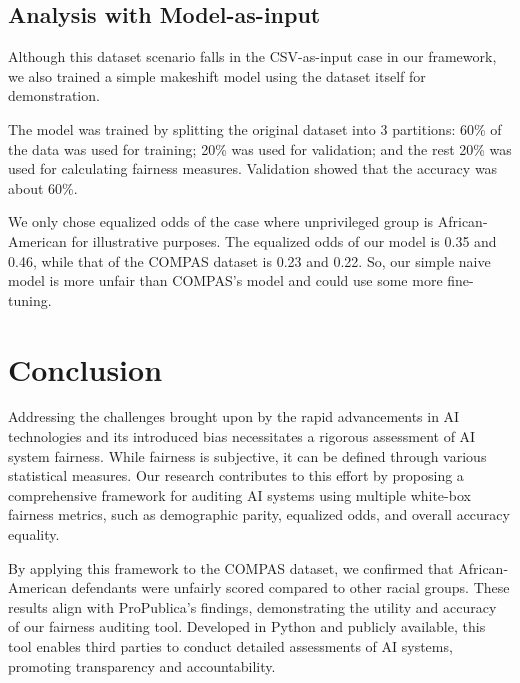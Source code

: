 \documentclass[conference]{IEEEtran}
\begin{document}
\subsection{Analysis with Model-as-input}
Although this dataset scenario falls in the CSV-as-input case in our framework, we also trained a simple makeshift model using the dataset itself for demonstration.

The model was trained by splitting the original dataset into 3 partitions: 60\% of the data was used for training; 20\% was used for validation; and the rest 20\% was used for calculating fairness measures. Validation showed that the accuracy was about 60\%.

We only chose equalized odds of the case where unprivileged group is African-American for illustrative purposes. The equalized odds of our model is 0.35 and 0.46, while that of the COMPAS dataset is 0.23 and 0.22. So, our simple naive model is more unfair than COMPAS's model and could use some more fine-tuning.

\section{Conclusion}
Addressing the challenges brought upon by the rapid advancements in AI technologies and its introduced bias necessitates a rigorous assessment of AI system fairness. While fairness is subjective, it can be defined through various statistical measures. Our research contributes to this effort by proposing a comprehensive framework for auditing AI systems using multiple white-box fairness metrics, such as demographic parity, equalized odds, and overall accuracy equality.

By applying this framework to the COMPAS dataset, we confirmed that African-American defendants were unfairly scored compared to other racial groups. These results align with ProPublica's findings, demonstrating the utility and accuracy of our fairness auditing tool. Developed in Python and publicly available, this tool enables third parties to conduct detailed assessments of AI systems, promoting transparency and accountability.
\end{document}
